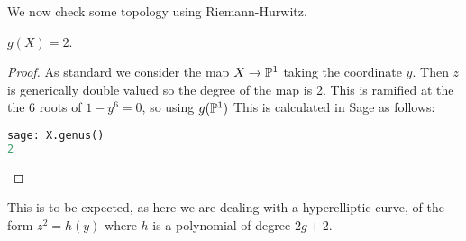 \documentclass{article}
\begin{document}
We now check some topology using Riemann-Hurwitz. 
\begin{prop}
	$g(X) = 2$.
\end{prop}
\begin{proof}
	As standard we consider the map $X\to \mathbb{P}^1$ taking the coordinate $y$. Then $z$ is generically double valued so the degree of the map is 2. This is ramified at the the 6 roots of $1-y^6=0$, so using $g(\mathbb{P}^1)$
This is calculated in Sage as follows:
\begin{lstlisting}[language=Python,frame=single]
sage: X.genus()
2
\end{lstlisting}
\end{proof}
\begin{remark}
	This is to be expected, as here we are dealing with a hyperelliptic curve, of the form $z^2=h(y)$ where $h$ is a polynomial of degree $2g+2$. 
\end{remark}
\end{document}
